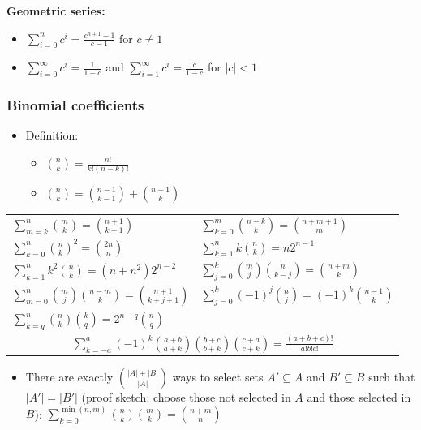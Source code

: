 \documentclass{article}
\newcounter{seccnt}
\newcounter{subseccnt}[seccnt]
\newcounter{subsubseccnt}[subseccnt]
\newcommand{\subsubsectionPath}{}
\newcommand{\setSubsubsection}[2][\subsubsectionPathName]{
	\def\subsubsectionPathName{#2}
	\subsubsection{#2}\label{sec:#1}
	\stepcounter{subsubseccnt}
	\renewcommand{\subsubsectionPath}{#1/}
}
\begin{document}
\begin{multicols}{3}
			\noindent\textbf{Geometric series:}
			\begin{itemize}
				\item $\sum_{i = 0}^{n}c^i = \frac{c^{n + 1} - 1}{c - 1}$ for $c \neq 1$
				\item  $\sum_{i = 0}^{ \infty }c^i = \frac{1}{1 - c}$ and $\sum_{i = 1}^{ \infty }c^i = \frac{c}{1 - c}$ for $\left|c\right| < 1$
			\end{itemize}

			\setSubsubsection{Binomial coefficients}

			\begin{itemize}
				\item Definition:
				\begin{itemize}
					\item $\binom{n}{k}=\frac{n!}{k!(n-k)!}$
					\item $\binom{n}{k}=\binom{n-1}{k-1}+\binom{n-1}{k}$
				\end{itemize}
			\end{itemize}
			\def\arraystretch{1.4}
			\noindent\begin{tabular}{ll}
				$\sum\limits_{m=k}^n \binom{m}{k} = \binom{n+1}{k+1}$ & $\sum\limits_{k=0}^m \binom{n+k}{k} = \binom{n+m+1}{m}$	\\
				$\sum\limits_{k=0}^n \binom{n}{k}^2 = \binom{2n}{n}$ & $\sum\limits_{k=1}^n k\binom{n}{k} = n2^{n-1}$ \\
				$\sum\limits_{k=1}^n k^2\binom{n}{k} = (n+n^2)2^{n-2}$ & $\sum\limits_{j=0}^k \binom{m}{j} \binom{n}{k-j} = \binom{n+m}{k}$ \\
				$\sum\limits_{m=0}^n \binom{m}{j} \binom{n-m}{k} = \binom{n+1}{k+j+1}$ &$\sum\limits_{j=0}^k (-1)^j \binom{n}{j} = (-1)^k \binom{n-1}{k}$ \\
				$\sum\limits_{k=q}^n \binom{n}{k} \binom{k}{q} = 2^{n-q} \binom{n}{q}$ & \\
				\multicolumn{2}{c}{$\sum\limits_{k=-a}^a (-1)^k \binom{a+b}{a+k}\binom{b+c}{b+k}\binom{c+a}{c+k} = \frac{(a+b+c)!}{a!b!c!}$}
			\end{tabular}
			\begin{itemize}
				\item There are exactly $\binom{\left|A\right| + \left|B\right|}{\left|A\right|}$ ways to select sets $A' \subseteq A$ and $B' \subseteq B$ such that $\left|A'\right| = \left|B'\right|$ (proof sketch: choose those not selected in $A$ and those selected in $B$): \newline
				$\sum\limits_{k=0}^{\min(n,m)} \binom{n}{k} \binom{m}{k} = \binom{n+m}{n}$
			\end{itemize}


\end{multicols}
\end{document}
